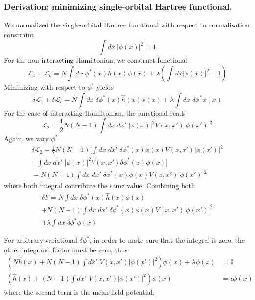 \documentclass[../../../main.tex]{subfiles}
\begin{document}
\subsubsection{Derivation: minimizing single-orbital Hartree functional.}
We normalized the single-orbital Hartree functional with respect to normalization constraint
\begin{equation*}
  \int dx \; |\phi(x)|^2 = 1
\end{equation*}
For the non-interacting Hamiltonian, we construct functional
\begin{equation*}
  \mathcal{L}_1+\mathcal{L}_c = N \int dx\; \phi ^*(x)\hat{h }(x)\phi(x) + \lambda \left( \int dx \left| \phi (x)\right|^2 - 1 \right)
\end{equation*}
Minimizing with respect to $\phi ^*$ yields
\begin{equation*}
  \delta{\mathcal{L}_1}+\delta \mathcal{L}_c 
  = N \int dx \; \delta \phi^{*} (x)\hat{h}(x) \phi(x) + \lambda \int  d x \; \delta\phi^{*} \phi(x)
\end{equation*}
For the case of interacting Hamiltonian, the functional reads
\begin{equation*}
  \mathcal{L}_2 = \frac{1}{2} N (N - 1) \int d{x} \; dx' \; |\phi(x)|^2 V(x,x') |\phi(x')|^2 
\end{equation*}
Again, we vary $\phi ^*$ 
\begin{multline*}
  \delta \mathcal{L}_2 = \frac{1}{2} N(N-1) \bigg[ \int dx\;dx' \; \delta \phi ^*(x)  \phi(x)V(x,x') |\phi(x')|^2 \\+ \int dx\;dx' \; |\phi(x)|^2  V(x,x')  \delta\phi ^*(x ) \phi(x)\bigg]\\
  = N (N-1)\int dx\;dx' \; \delta \phi ^*(x)  \phi(x)V(x,x') |\phi(x')|^2
\end{multline*}
where both integral contribute the same value.
Combining both
\begin{multline*}
  \delta F 
  = N \int dx \; \delta \phi^{*} (x)\hat{h}(x) \phi(x) \\
  +  N (N-1)\int dx\;dx' \; \delta \phi ^*(x)  \phi(x)V(x,x') |\phi(x')|^2 \\
  +\lambda \int  d x \; \delta\phi^{*} \phi(x)
\end{multline*}

For arbitrary variational $\delta\phi ^*$, in order to make sure that the integral is zero, the other integrand factor must be zero, thus
\begin{align*}
  \left(   N \hat{h }(x  )+   N (N-1)\int dx' \;V(x,x') |\phi(x')|^2 \right) \phi(x)
  +\lambda\phi(x)                                                                & = 0               \\
  \left(   \hat{h }(x  )+   (N-1)\int dx' \;V(x,x') |\phi(x')|^2 \right) \phi(x) & = \epsilon\phi(x)
\end{align*}
where the second term is the mean-field potential.
\end{document}
